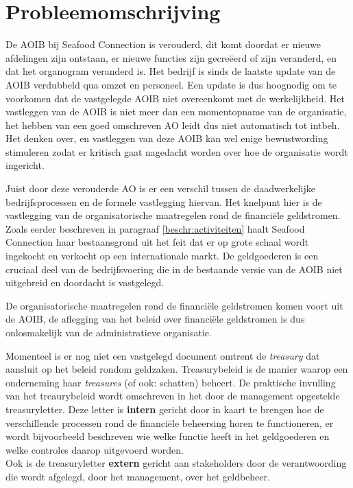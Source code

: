 \section{Probleemomschrijving}
\label{beschr:problemen}
De AOIB bij Seafood Connection is verouderd, dit komt doordat er nieuwe afdelingen zijn ontstaan, er nieuwe functies zijn gecreëerd of zijn veranderd, en dat het organogram veranderd is. Het bedrijf is sinds de laatste update van de AOIB verdubbeld qua omzet en personeel. Een update is dus hoognodig om te voorkomen dat de vastgelegde AOIB niet overeenkomt met de werkelijkheid. Het vastleggen van de AOIB is niet meer dan een momentopname van de organisatie, het hebben van een goed omschreven AO leidt dus niet automatisch tot \gls{intbeh}. Het denken over, en vastleggen van deze AOIB kan wel enige bewustwording stimuleren zodat er kritisch gaat nagedacht worden over hoe de organisatie wordt ingericht. \citep{bivpraktijk}

Juist door deze verouderde AO is er een verschil tussen de daadwerkelijke bedrijfsprocessen en de formele vastlegging hiervan. 
Het knelpunt hier is de vastlegging van de organisatorische maatregelen rond de financiële geldstromen. Zoals eerder beschreven in paragraaf \ref{beschr:activiteiten} haalt Seafood Connection haar bestaansgrond uit het feit dat er op grote schaal wordt ingekocht en verkocht op een internationale markt. De \gls{geldgoederen} is een cruciaal deel van de bedrijfsvoering die in de bestaande versie van de AOIB niet uitgebreid en doordacht is vastgelegd. \citep{aoibsfc}

De organisatorische maatregelen rond de financiële geldstromen komen voort uit de AOIB, de aflegging van het beleid over financiële geldstromen is dus onlosmakelijk van de administratieve organisatie. 

Momenteel is er nog niet een vastgelegd document omtrent de \textit{\gls{treasury}} dat aansluit op het beleid rondom geldzaken. Treasurybeleid is de manier waarop een onderneming haar \textit{treasures} (of ook: schatten) beheert. De praktische invulling van het treaurybeleid wordt omschreven in het door de management opgestelde \gls{treasuryletter}. 
Deze letter is \textbf{intern} gericht door in kaart te brengen hoe de verschillende processen rond de financiële beheersing horen te functioneren, er wordt bijvoorbeeld beschreven wie welke functie heeft in het \gls{geldgoederen} en welke controles daarop uitgevoerd worden. \\
Ook is de \gls{treasuryletter} \textbf{extern} gericht aan stakeholders door de verantwoording die wordt afgelegd, door het management, over het geldbeheer. \citep{jans}

